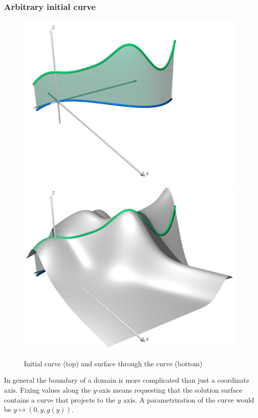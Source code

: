 \subsubsection{Arbitrary initial curve}
\begin{figure}
\includegraphics{2-classification/images/cauchycurve.pdf}
\includegraphics{2-classification/images/cauchy.pdf}%
\caption{Initial curve (top) and surface through the curve (bottom)
\label{cauchy:curve}}
\end{figure}
In general the boundary of a domain is more complicated than just 
a coordinate axis.
Fixing values along the $y$-axis means requesting that the solution
surface contains a curve that projects to the $y$ axis.
A parametrization of the curve would be $y\mapsto (0,y,g(y))$.

